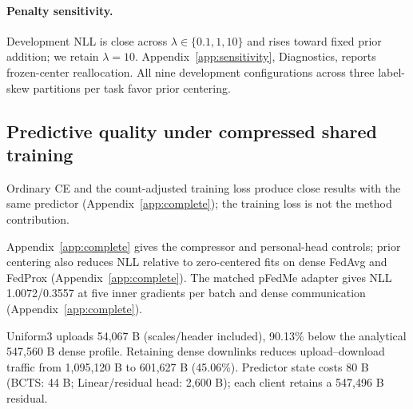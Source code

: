 \paragraph{Penalty sensitivity.}
Development NLL is close across $\lambda\in\{0.1,1,10\}$ and rises toward fixed prior addition; we retain $\lambda=10$. Appendix~\ref{app:sensitivity}, Diagnostics, reports frozen-center reallocation. All nine development configurations across three label-skew partitions per task favor prior centering.



\subsection{Predictive quality under compressed shared training}

Ordinary CE and the count-adjusted training loss produce close results with the same predictor (Appendix~\ref{app:complete}); the training loss is not the method contribution.


Appendix~\ref{app:complete} gives the compressor and personal-head controls; prior centering also reduces NLL relative to zero-centered fits on dense FedAvg and FedProx (Appendix~\ref{app:complete}). The matched pFedMe adapter gives NLL 1.0072/0.3557 at five inner gradients per batch and dense communication (Appendix~\ref{app:complete}).

Uniform3 uploads 54,067 B (scales/header included), 90.13\% below the analytical 547,560 B dense profile. Retaining dense downlinks reduces upload--download traffic from 1,095,120 B to 601,627 B (45.06\%). Predictor state costs 80 B (BCTS: 44 B; Linear/residual head: 2,600 B); each client retains a 547,496 B residual.


